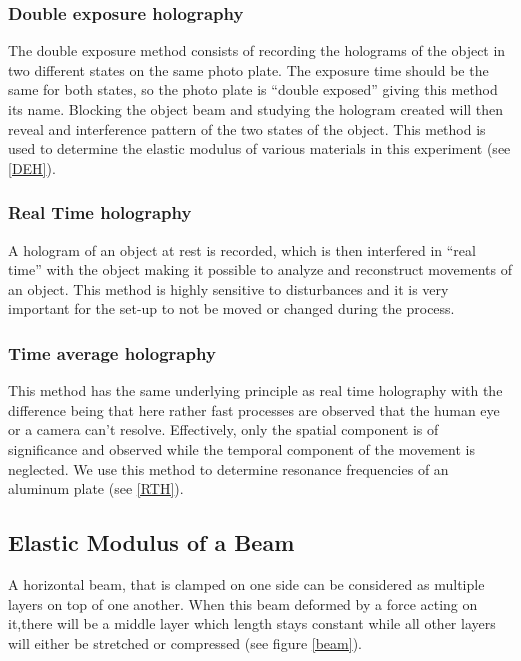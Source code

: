 \subsubsection{Double exposure holography}

The double exposure method consists of recording the holograms of the object in two different states on the same photo plate. The exposure time should be the same for both states, so the photo plate is ``double exposed'' giving this method its name. Blocking the object beam and studying the hologram created will then reveal and interference pattern of the two states of the object. This method is used to determine the elastic modulus of various materials in this experiment (see \ref{DEH}).

\subsubsection{Real Time holography}

A hologram of an object at rest is recorded, which is then interfered in ``real time'' with the object making it possible to analyze  and reconstruct movements of an object. This method is highly sensitive to disturbances and it is very important for the set-up to not be moved or changed during the process. 

\subsubsection{Time average holography}

This method has the same underlying principle as real time holography with the difference being that here rather fast processes are observed that the human eye or a camera can't resolve. Effectively, only the spatial component is of significance and observed while the temporal component of the movement is neglected. We use this method to determine resonance frequencies of an aluminum plate (see \ref{RTH}).



\subsection{Elastic Modulus of a Beam \label{EMB}}

A horizontal beam, that is clamped on one side can be considered as multiple layers on top of one another. When this beam deformed by a force acting on it,there will be a middle layer which length stays constant while all other layers will either be stretched or compressed (see figure \ref{beam}).

